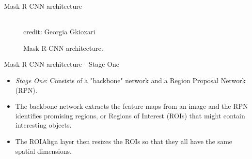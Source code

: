 \begin{frame} {Mask R-CNN architecture}
  \begin{figure}
    \centering
      \tiny{\\credit: Georgia Gkioxari}
      \caption{Mask R-CNN architecture.}
  \end{figure}
\end{frame}

\begin{frame} {Mask R-CNN architecture - Stage One}
  \begin{figure}
    \centering
  \end{figure}
  \begin{itemize}
    \item \textit{Stage One}: Consists of a "backbone" network and a Region Proposal Network (RPN).
    \item The backbone network extracts the feature maps from an image and the RPN identifies promising regions, or Regions of Interest (ROIs) that might contain interesting objects.
    \item The ROIAlign layer then resizes the ROIs so that they all have the same spatial dimensions.
  \end{itemize}
\end{frame}

